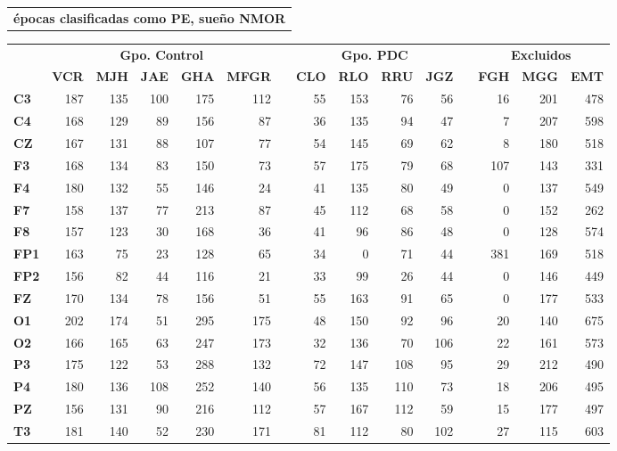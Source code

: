 \documentclass[12pt,a4paper]{mitthesis}
\begin{document}
\begin{SidewaysTable}
\centering
\begin{tabular}{c}
\textbf{\'epocas clasificadas como PE, sue\~no NMOR}
\vspace{1em}
\end{tabular}
\begin{tabular}{lrrrrrcrrrrcrrr}
\toprule
& \multicolumn{5}{c}{\textbf{Gpo. Control}} && 
  \multicolumn{4}{c}{\textbf{Gpo. PDC}} && 
  \multicolumn{3}{c}{\textbf{Excluidos}}\\
\cmidrule{2-6} \cmidrule{8-11} \cmidrule{13-15}
& \textbf{VCR} & \textbf{MJH} & \textbf{JAE} & \textbf{GHA} & \textbf{MFGR} & \phantom{l}
& \textbf{CLO} & \textbf{RLO} & \textbf{RRU} & \textbf{JGZ} & \phantom{l}
& \textbf{FGH} & \textbf{MGG} & \textbf{EMT} \\
\midrule
\textbf{C3} &187&135&100&175&112&&55 &153&76 &56 &&16 &201&478 \\
\textbf{C4} &168&129&89 &156&87 &&36 &135&94 &47 &&7  &207&598 \\
\textbf{CZ} &167&131&88 &107&77 &&54 &145&69 &62 &&8  &180&518 \\
\rowcolor{gris}
\textbf{F3} &168&134&83 &150&73 &&57 &175&79 &68 &&107&143&331 \\
\rowcolor{gris}
\textbf{F4} &180&132&55 &146&24 &&41 &135&80 &49 &&0  &137&549 \\
\rowcolor{gris}
\textbf{F7} &158&137&77 &213&87 &&45 &112&68 &58 &&0  &152&262 \\
\rowcolor{gris}
\textbf{F8} &157&123&30 &168&36 &&41 &96 &86 &48 &&0  &128&574 \\
\textbf{FP1}&163&75 &23 &128&65 &&34 &0  &71 &44 &&381&169&518 \\
\textbf{FP2}&156&82 &44 &116&21 &&33 &99 &26 &44 &&0  &146&449 \\
\textbf{FZ} &170&134&78 &156&51 &&55 &163&91 &65 &&0  &177&533 \\
\rowcolor{gris}
\textbf{O1} &202&174&51 &295&175&&48 &150&92 &96 &&20 &140&675 \\
\rowcolor{gris}
\textbf{O2} &166&165&63 &247&173&&32 &136&70 &106&&22 &161&573 \\
\textbf{P3} &175&122&53 &288&132&&72 &147&108&95 &&29 &212&490 \\
\textbf{P4} &180&136&108&252&140&&56 &135&110&73 &&18 &206&495 \\
\textbf{PZ} &156&131&90 &216&112&&57 &167&112&59 &&15 &177&497 \\
\rowcolor{gris}
\textbf{T3} &181&140&52 &230&171&&81 &112&80 &102&&27 &115&603 \\

\end{tabular}
\end{SidewaysTable}
\end{document}
